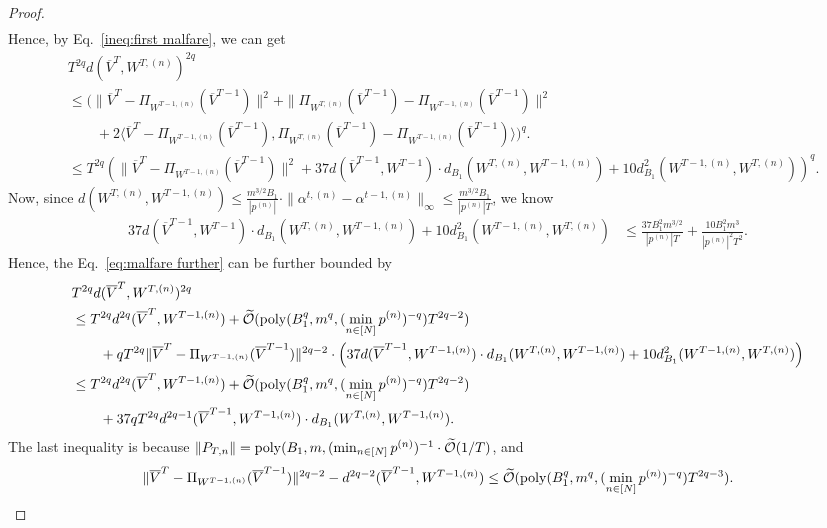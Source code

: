 \begin{proof}
\begin{align}
\end{align}
Hence, by Eq.~\eqref{ineq:first malfare}, we can get 
\begin{align}
    &T^{2q} d(\overline{V}^T, W^{T,(n)})^{2q}  \nonumber\\&\le \Bigg(\|\overline{V}^T - \Pi_{W^{T-1,(n)}}(\overline{V}^{T-1})\|^2 + \|\Pi_{W^{T,(n)}}(\overline{V}^{T-1}) - \Pi_{W^{T-1,(n)}}(\overline{V}^{T-1})\|^2\nonumber \\&\qquad + 2\langle \overline{V}^T - \Pi_{W^{T-1,(n)}}(\overline{V}^{T-1}), \Pi_{W^{T,(n)}}(\overline{V}^{T-1}) - \Pi_{W^{T-1,(n)}}(\overline{V}^{T-1})\rangle\Bigg)^{q}.\nonumber\\
    &\le T^{2q}\left(\|\overline{V}^T - \Pi_{W^{T-1,(n)}}(\overline{V}^{T-1})\|^{2} + 37d(\overline{V}^{T-1}, W^{T-1})\cdot d_{B_1}(W^{T,(n)}, W^{T-1,(n)}) + 10d^2_{B_1}(W^{T-1,(n)}, W^{T,(n)})\right)^q.\label{eq:malfare further}
    \end{align}
    Now, since $d(W^{T,(n)}, W^{T-1,(n)}) \le \frac{m^{3/2}B_1}{|p^{(n)}|}\cdot \|\alpha^{t,(n)}-\alpha^{t-1,(n)}\|_\infty \le \frac{m^{3/2}B_1}{|p^{(n)}|T}$, we know 
\begin{align}
    37d(\overline{V}^{T-1}, W^{T-1})\cdot d_{B_1}(W^{T,(n)}, W^{T-1,(n)}) + 10d^2_{B_1}(W^{T-1,(n)}, W^{T,(n)}) &\le \frac{37B_1^2m^{3/2}}{|p^{(n)}|T} + \frac{10B_1^2m^3}{|p^{(n)}|^2 T^2}.
\end{align}
Hence, the Eq.~\eqref{eq:malfare further} can be further bounded by 
    \begin{align*}
    &T^{2q} d(\overline{V}^T, W^{T,(n)})^{2q}\\
    &\le T^{2q}d^{2q}(\overline{V}^T, W^{T-1,(n)}) + \widetilde{\mathcal{O}}(\mathrm{poly}(B_1^{q},m^{q}, (\min_{n \in [N]}p^{(n)})^{-q})T^{2q-2})\\&\qquad + qT^{2q}\|\overline{V}^T - \Pi_{W^{T-1,(n)}}(\overline{V}^{T-1})\|^{2q-2}\cdot \left(37d(\overline{V}^{T-1}, W^{T-1,(n)})\cdot d_{B_1}(W^{T,(n)}, W^{T-1,(n)}) + 10d^2_{B_1}(W^{T-1,(n)}, W^{T,(n)})\right)\\
    &\le T^{2q}d^{2q}(\overline{V}^T, W^{T-1,(n)}) + \widetilde{\mathcal{O}}(\mathrm{poly}(B_1^{q},m^{q}, (\min_{n \in [N]}p^{(n)})^{-q})T^{2q-2}) \\&\qquad + 37qT^{2q}d^{2q-1}(\overline{V}^{T-1}, W^{T-1,(n)}) \cdot d_{B_1}(W^{T,(n)}, W^{T-1,(n)}) .
\end{align*}
The last inequality is because $\|P_{T,n}\| = \mathrm{poly}(B_1,m,(\min_{n \in [N]}p^{(n)})^{-1} \cdot \widetilde{\mathcal{O}}(1/T)$, and $$\|\overline{V}^T - \Pi_{W^{T-1,(n)}}(\overline{V}^{T-1})\|^{2q-2} - d^{2q-2}(\overline{V}^{T-1}, W^{T-1,(n)}) \le \widetilde{\mathcal{O}}(\mathrm{poly}(B_1^{q},m^{q}, (\min_{n \in [N]}p^{(n)})^{-q})T^{2q-3}).$$

\end{proof}
